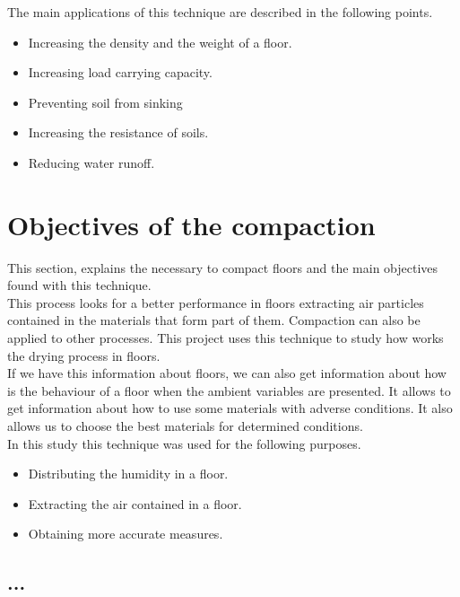 The main applications of this technique are described in the following points.

\begin{itemize}

\item Increasing the density and the weight of a floor.

\item Increasing load carrying capacity.

\item Preventing soil from sinking

\item Increasing the resistance of soils.

\item Reducing water runoff.

\end{itemize}

\section{Objectives of the compaction}

This section, explains the necessary to compact floors and the main objectives found with this technique.\\

This process looks for a better performance in floors extracting air particles contained in the materials that form part of them. Compaction can also be applied to other processes. This project uses this technique to study how works the drying process in floors.\\

If we have this information about floors, we can also get information about how is the behaviour of a floor when the ambient variables are presented. It allows to get information about how to use some materials with adverse conditions. It also allows us to choose the best materials for determined conditions.\\

In this study this technique was used for the following purposes.

\begin{itemize}

\item Distributing the humidity in a floor.

\item Extracting the air contained in a floor.

\item Obtaining more accurate measures.

\end{itemize}

\subsection{...}

\newpage
